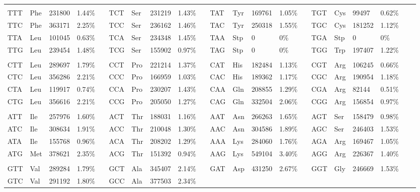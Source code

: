 \begin{table}
\begin{center}
{\tiny
\begin{tabular}{*{21}{l}}
\hline
\\
TTT & Phe & 231800	& 1.44\%	&	&
TCT & Ser & 231219	& 1.43\%	&	&
TAT & Tyr & 169761	& 1.05\%	&	&
TGT & Cys & 99497	& 0.62\%	&	&
\\
TTC & Phe & 363171	& 2.25\%	&	&
TCC & Ser & 236162	& 1.46\%	&	&
TAC & Tyr & 250318	& 1.55\%	&	&
TGC & Cys & 181252	& 1.12\%	&	&
\\
TTA & Leu & 101045	& 0.63\%	&	&
TCA & Ser & 234348	& 1.45\%	&	&
TAA & Stp & 0	& 0\%	&	&
TGA & Stp & 0	& 0\%	&	&
\\
TTG & Leu & 239454	& 1.48\%	&	&
TCG & Ser & 155902	& 0.97\%	&	&
TAG & Stp & 0	& 0\%	&	&
TGG & Trp & 197407	& 1.22\%	&	&
\\
\\
CTT & Leu & 289697	& 1.79\%	&	&
CCT & Pro & 221214	& 1.37\%	&	&
CAT & His & 182484	& 1.13\%	&	&
CGT & Arg & 106245	& 0.66\%	&	&
\\
CTC & Leu & 356286	& 2.21\%	&	&
CCC & Pro & 166959	& 1.03\%	&	&
CAC & His & 189362	& 1.17\%	&	&
CGC & Arg & 190954	& 1.18\%	&	&
\\
CTA & Leu & 119917	& 0.74\%	&	&
CCA & Pro & 230207	& 1.43\%	&	&
CAA & Gln & 208855	& 1.29\%	&	&
CGA & Arg & 82144	& 0.51\%	&	&
\\
CTG & Leu & 356616	& 2.21\%	&	&
CCG & Pro & 205050	& 1.27\%	&	&
CAG & Gln & 332504	& 2.06\%	&	&
CGG & Arg & 156854	& 0.97\%	&	&
\\
\\
ATT & Ile & 257976	& 1.60\%	&	&
ACT & Thr & 188031	& 1.16\%	&	&
AAT & Asn & 266263	& 1.65\%	&	&
AGT & Ser & 158479	& 0.98\%	&	&
\\
ATC & Ile & 308634	& 1.91\%	&	&
ACC & Thr & 210048	& 1.30\%	&	&
AAC & Asn & 304586	& 1.89\%	&	&
AGC & Ser & 246403	& 1.53\%	&	&
\\
ATA & Ile & 155768	& 0.96\%	&	&
ACA & Thr & 208202	& 1.29\%	&	&
AAA & Lys & 284060	& 1.76\%	&	&
AGA & Arg & 169467	& 1.05\%	&	&
\\
ATG & Met & 378621	& 2.35\%	&	&
ACG & Thr & 151392	& 0.94\%	&	&
AAG & Lys & 549104	& 3.40\%	&	&
AGG & Arg & 226367	& 1.40\%	&	&
\\
\\
GTT & Val & 289284	& 1.79\%	&	&
GCT & Ala & 345407	& 2.14\%	&	&
GAT & Asp & 431250	& 2.67\%	&	&
GGT & Gly & 246669	& 1.53\%&	&
\\
GTC & Val & 291192	& 1.80\%	&	&
GCC & Ala & 377503	& 2.34\%	&	&

\end{tabular}}
\end{center}
\end{table}
